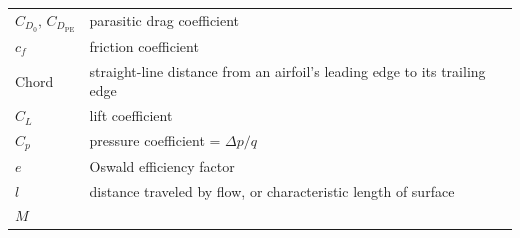 \documentclass[
]{book}
\begin{document}
\begin{longtable}[]{@{}ll@{}}
\begin{minipage}[t]{0.22\columnwidth}
\(C_{D_0}\text{, }C_{D_{\mathrm{PE}}}\)\strut
\end{minipage} & \begin{minipage}[t]{0.72\columnwidth}\raggedright
parasitic drag coefficient\strut
\end{minipage}\tabularnewline
\begin{minipage}[t]{0.22\columnwidth}\raggedright
\(c_f\)\strut
\end{minipage} & \begin{minipage}[t]{0.72\columnwidth}\raggedright
friction coefficient\strut
\end{minipage}\tabularnewline
\begin{minipage}[t]{0.22\columnwidth}\raggedright
Chord\strut
\end{minipage} & \begin{minipage}[t]{0.72\columnwidth}\raggedright
straight-line distance from an airfoil's leading edge to its trailing edge\strut
\end{minipage}\tabularnewline
\begin{minipage}[t]{0.22\columnwidth}\raggedright
\(C_L\)\strut
\end{minipage} & \begin{minipage}[t]{0.72\columnwidth}\raggedright
lift coefficient\strut
\end{minipage}\tabularnewline
\begin{minipage}[t]{0.22\columnwidth}\raggedright
\(C_p\)\strut
\end{minipage} & \begin{minipage}[t]{0.72\columnwidth}\raggedright
pressure coefficient = \(\Delta p/q\)\strut
\end{minipage}\tabularnewline
\begin{minipage}[t]{0.22\columnwidth}\raggedright
\(e\)\strut
\end{minipage} & \begin{minipage}[t]{0.72\columnwidth}\raggedright
Oswald efficiency factor\strut
\end{minipage}\tabularnewline
\begin{minipage}[t]{0.22\columnwidth}\raggedright
\(l\)\strut
\end{minipage} & \begin{minipage}[t]{0.72\columnwidth}\raggedright
distance traveled by flow, or characteristic length of surface\strut
\end{minipage}\tabularnewline
\begin{minipage}[t]{0.22\columnwidth}\raggedright
\(M\)\strut
\end{minipage} & \begin{minipage}[t]{0.72\columnwidth}\raggedright

\end{minipage}
\end{longtable}
\end{document}
